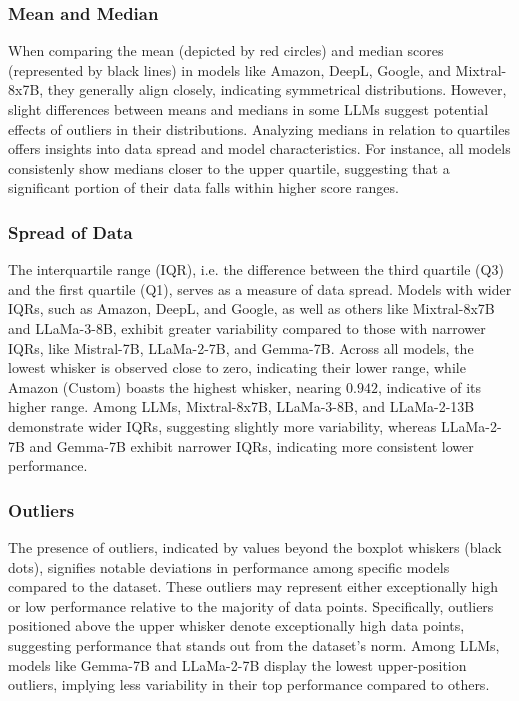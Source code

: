 \subsubsection{Mean and Median}

When comparing the mean (depicted by red circles) and median scores (represented by black lines) in models like Amazon, DeepL, Google, and Mixtral-8x7B, they generally align closely, indicating symmetrical distributions. However, slight differences between means and medians in some LLMs suggest potential effects of outliers in their distributions. Analyzing medians in relation to quartiles offers insights into data spread and model characteristics. For instance, all models consistenly show medians closer to the upper quartile, suggesting that a significant portion of their data falls within higher score ranges.


\subsubsection{Spread of Data}

The interquartile range (IQR), i.e. the difference between the third quartile (Q3) and the first quartile (Q1), serves as a measure of data spread. Models with wider IQRs, such as Amazon, DeepL, and Google, as well as others like Mixtral-8x7B and LLaMa-3-8B, exhibit greater variability compared to those with narrower IQRs, like Mistral-7B, LLaMa-2-7B, and Gemma-7B. Across all models, the lowest whisker is observed close to zero, indicating their lower range, while Amazon (Custom) boasts the highest whisker, nearing $0.942$, indicative of its higher range. Among LLMs, Mixtral-8x7B, LLaMa-3-8B, and LLaMa-2-13B demonstrate wider IQRs, suggesting slightly more variability, whereas LLaMa-2-7B and Gemma-7B exhibit narrower IQRs, indicating more consistent lower performance.


\subsubsection{Outliers}

The presence of outliers, indicated by values beyond the boxplot whiskers (black dots), signifies notable deviations in performance among specific models compared to the dataset. These outliers may represent either exceptionally high or low performance relative to the majority of data points. Specifically, outliers positioned above the upper whisker denote exceptionally high data points, suggesting performance that stands out from the dataset's norm. Among LLMs, models like Gemma-7B and LLaMa-2-7B display the lowest upper-position outliers, implying less variability in their top performance compared to others.


